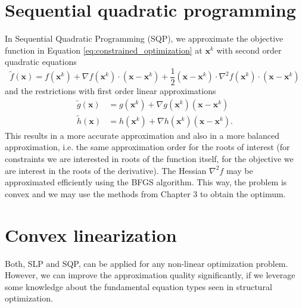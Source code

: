 \section{Sequential quadratic programming}
In Sequential Quadratic Programming (SQP), we approximate the objective function in Equation \eqref{eq:constrained_optimization} at $\mathbf{x}^k$ with second order quadratic equations  
\begin{equation}
    \tilde{f}(\mathbf{x}) = f(\mathbf{x}^k) + \nabla f (\mathbf{x}^k) \cdot \left(\mathbf{x} - \mathbf{x}^k \right) + \frac{1}{2}\left(\mathbf{x} - \mathbf{x}^k \right) \cdot \nabla^2 f(\mathbf{x}^k) \cdot \left(\mathbf{x} - \mathbf{x}^k \right)
\end{equation}
and the restrictions with first order linear approximations
\begin{align}
    \tilde{g}(\mathbf{x}) &= g(\mathbf{x}^k) + \nabla g(\mathbf{x}^k) \left(\mathbf{x} - \mathbf{x}^k \right) \\
    \tilde{h}(\mathbf{x}) &= h(\mathbf{x}^k) + \nabla h(\mathbf{x}^k) \left(\mathbf{x} - \mathbf{x}^k \right).
\end{align}
This results in a more accurate approximation and also in a more balanced approximation, i.e. the same approximation order for the roots of interest (for constraints we are interested in roots of the function itself, for the objective we are interest in the roots of the derivative). 
The Hessian $\nabla^2 f$ may be approximated efficiently using the BFGS algorithm. This way, the problem is convex and we may use the methods from Chapter 3 to obtain the optimum. 

\section{Convex linearization}
Both, SLP and SQP, can be applied for any non-linear optimization problem. However, we can improve the approximation quality significantly, if we leverage some knowledge about the fundamental equation types seen in structural optimization.

